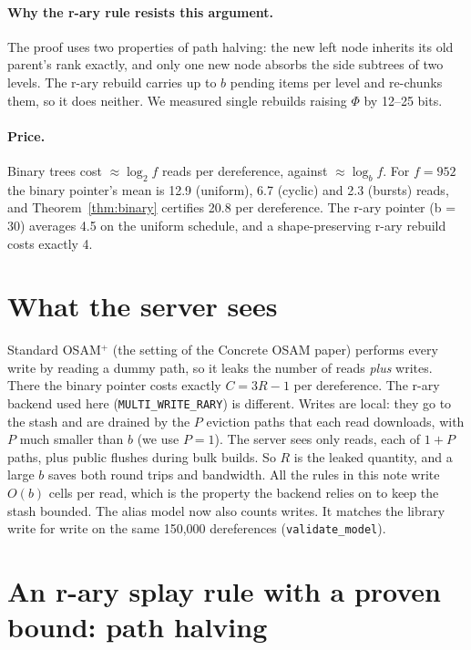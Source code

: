 \documentclass[11pt]{article}
\theoremstyle{definition}
\begin{document}
\paragraph{Why the r-ary rule resists this argument.} The proof uses two
properties of path halving: the new left node inherits its old parent's rank
exactly, and only one new node absorbs the side subtrees of two levels. The
r-ary rebuild carries up to $b$ pending items per level and re-chunks them,
so it does neither. We measured single rebuilds raising $\Phi$ by 12--25 bits.

\paragraph{Price.} Binary trees cost $\approx\log_2 f$ reads per dereference,
against $\approx\log_b f$. For $f=952$ the binary pointer's mean is 12.9
(uniform), 6.7 (cyclic) and 2.3 (bursts) reads, and Theorem~\ref{thm:binary}
certifies 20.8 per dereference. The r-ary pointer (b = 30) averages 4.5 on the
uniform schedule, and a shape-preserving r-ary rebuild costs exactly 4.

\section{What the server sees}
\label{sec:rw}

Standard OSAM$^+$ (the setting of the Concrete OSAM paper) performs every
write by reading a dummy path, so it leaks the number of reads \emph{plus}
writes. There the binary pointer costs exactly $C=3R-1$ per dereference. The
r-ary backend used here (\texttt{MULTI\_WRITE\_RARY}) is different. Writes are
local: they go to the stash and are drained by the $P$ eviction paths that each
read downloads, with $P$ much smaller than $b$ (we use $P=1$). The server sees
only reads, each of $1+P$ paths, plus public flushes during bulk builds. So
$R$ is the leaked quantity, and a large $b$ saves both round trips and
bandwidth. All the rules in this note write $O(b)$ cells per read, which is
the property the backend relies on to keep the stash bounded. The alias model
now also counts writes. It matches the library write for write on the same
150{,}000 dereferences (\texttt{validate\_model}).

\section{An r-ary splay rule with a proven bound: path halving}
\label{sec:halving}
\end{document}
